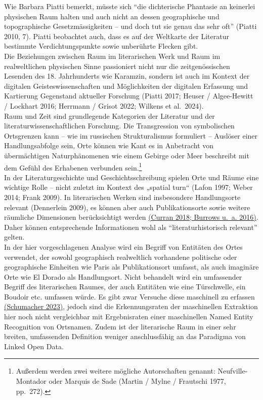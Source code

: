 \documentclass[
  12pt,
  letterpaper,
  DIV=11,
  numbers=noendperiod]{scrreprt}
\begin{document}
Wie Barbara Piatti bemerkt, müsste sich ``die dichterische Phantasie an
keinerlei physischen Raum halten und auch nicht an dessen geographische
und topographische Gesetzmässigkeiten -- und doch tut sie genau das sehr
oft'' (Piatti 2010, 7). Piatti beobachtet auch, dass es auf der
Weltkarte der Literatur bestimmte Verdichtungspunkte sowie unberührte
Flecken gibt.\\
Die Beziehungen zwischen Raum im literarischen Werk und Raum im
realweltlichen physischen Sinne passioniert nicht nur die
zeitgenössischen Lesenden des 18. Jahrhunderts wie Karamzin, sondern ist
auch im Kontext der digitalen Geisteswissenschaften und Möglichkeiten
der digitalen Erfassung und Kartierung Gegenstand aktueller Forschung
(Piatti 2017; Heuser / Algee-Hewitt / Lockhart 2016; Herrmann / Grisot
2022; Wilkens et al.~2024).\\
Raum und Zeit sind grundlegende Kategorien der Literatur und der
literaturwissenschaftlichen Forschung. Die Transgression von
symbolischen Ortsgrenzen kann -- wie im russischen Strukturalismus
formuliert -- Auslöser einer Handlungsabfolge sein, Orte können wie Kant
es in Anbetracht von übermächtigen Naturphänomenen wie einem Gebirge
oder Meer beschreibt mit dem Gefühl des Erhabenen verbunden
sein.\footnote{Außerdem werden zwei weitere mögliche Autorschaften
  genannt: Neufville-Montador oder Marquis de Sade (Martin / Mylne /
  Frautschi 1977, pp.~272).}\\
In der Literaturgeschichte und Geschichtsschreibung spielen Orte und
Räume eine wichtige Rolle -- nicht zuletzt im Kontext des „spatial
turn`` (Lafon 1997; Weber 2014; Frank 2009). In literarischen Werken
sind insbesondere Handlungsorte relevant (Dennerlein 2009), es können
aber auch Publikationsorte sowie weitere räumliche Dimensionen
berücksichtigt werden
\href{https://www.zotero.org/google-docs/?broken=yQhVII}{(Curran 2018;
Burrows u.~a. 2016)}. Daher können entsprechende Informationen wohl als
``literaturhistorisch relevant'' gelten.\\
In der hier vorgeschlagenen Analyse wird ein Begriff von Entitäten des
Ortes verwendet, der sowohl geographisch realweltlich vorhandene
politische oder geographische Einheiten wie Paris als Publikationsort
umfasst, als auch imaginäre Orte wie El Dorado als Handlungsort. Nicht
behandelt wird ein umfassender Begriff des literarischen Raumes, der
auch Entitäten wie eine Türschwelle, ein Boudoir etc. umfassen würde. Es
gibt zwar Versuche diese maschinell zu erfassen
\href{https://www.zotero.org/google-docs/?broken=KKZsjN}{(Schumacher
2023)}, jedoch sind die Erkennungsraten der maschinellen Extraktion hier
noch nicht vergleichbar mit Ergebnisraten einer maschinellen Named
Entity Recognition von Ortsnamen. Zudem ist der literarische Raum in
einer sehr breiten, umfassenden Definition weniger anschlussfähig an das
Paradigma von Linked Open Data.
\end{document}
